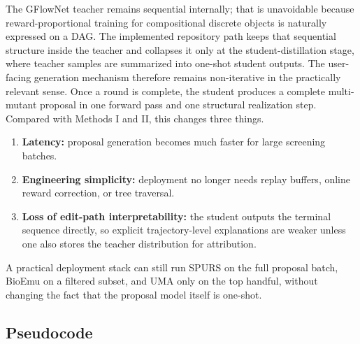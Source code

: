 \documentclass[11pt]{article}
\begin{document}
	The GFlowNet teacher remains sequential internally; that is unavoidable because reward-proportional training for compositional discrete objects is naturally expressed on a DAG. The implemented repository path keeps that sequential structure inside the teacher and collapses it only at the student-distillation stage, where teacher samples are summarized into one-shot student outputs. The user-facing generation mechanism therefore remains non-iterative in the practically relevant sense. Once a round is complete, the student produces a complete multi-mutant proposal in one forward pass and one structural realization step. Compared with Methods I and II, this changes three things.
	\begin{enumerate}[leftmargin=1.5em]
		\item \textbf{Latency:} proposal generation becomes much faster for large screening batches.
		\item \textbf{Engineering simplicity:} deployment no longer needs replay buffers, online reward correction, or tree traversal.
		\item \textbf{Loss of edit-path interpretability:} the student outputs the terminal sequence directly, so explicit trajectory-level explanations are weaker unless one also stores the teacher distribution for attribution.
	\end{enumerate}
	A practical deployment stack can still run SPURS on the full proposal batch, BioEmu on a filtered subset, and UMA only on the top handful, without changing the fact that the proposal model itself is one-shot.
	
	\subsection{Pseudocode}
	
\end{document}
